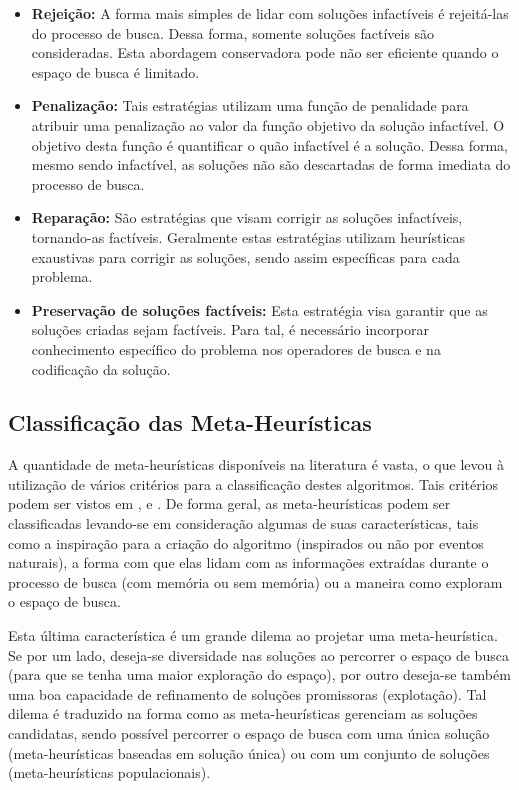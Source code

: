 \begin{itemize}
\item \textbf{Rejeição:} A forma mais simples de lidar com soluções infactíveis é rejeitá-las do processo de busca. Dessa forma, somente soluções factíveis são consideradas. Esta abordagem conservadora pode não ser eficiente quando o espaço de busca é limitado.
\item \textbf{Penalização:} Tais estratégias utilizam uma função de penalidade para atribuir uma penalização ao valor da função objetivo da solução infactível. O objetivo desta função é quantificar o quão infactível é a solução. Dessa forma, mesmo sendo infactível, as soluções não são descartadas de forma imediata do processo de busca.
\item \textbf{Reparação:} São estratégias que visam corrigir as soluções infactíveis, tornando-as factíveis. Geralmente estas estratégias utilizam heurísticas exaustivas para corrigir as soluções, sendo assim específicas para cada problema.
\item\textbf{Preservação de soluções factíveis:} Esta estratégia visa garantir que as soluções criadas sejam factíveis. Para tal, é necessário incorporar conhecimento específico do problema nos operadores de busca e na codificação da solução.

\end{itemize}

\subsection{Classificação das Meta-Heurísticas}
\label{subsec:subc215}
A quantidade de meta-heurísticas disponíveis na literatura é vasta, o que levou à utilização de vários critérios para a classificação destes algoritmos. Tais critérios podem ser vistos em \cite{Blum2003}, \cite{Talbi2009} e \cite{Boussaid2013}. De forma geral, as meta-heurísticas podem ser classificadas levando-se em consideração algumas de suas características, tais como a inspiração para a criação do algoritmo (inspirados ou não por eventos naturais), a forma com que elas lidam com as informações extraídas durante o processo de busca (com memória ou sem memória) ou a maneira como exploram o espaço de busca.

Esta última característica é um grande dilema ao projetar uma meta-heurística. Se por um lado, deseja-se diversidade nas soluções ao percorrer o espaço de busca (para que se tenha uma maior exploração do espaço), por outro deseja-se também uma boa capacidade de refinamento de soluções promissoras (explotação). Tal dilema é traduzido na forma como as meta-heurísticas gerenciam as soluções candidatas, sendo possível percorrer o espaço de busca com uma única solução (meta-heurísticas baseadas em solução única) ou com um conjunto de soluções (meta-heurísticas populacionais).

